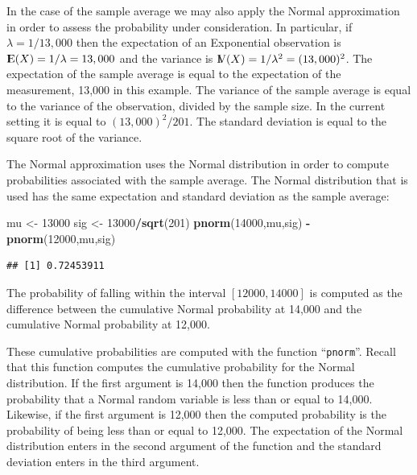 \documentclass[]{krantz}
\makeatletter
\newenvironment{Shaded}{\begin{snugshade}}{\end{snugshade}}
\newcommand{\KeywordTok}[1]{\textcolor[rgb]{0.13,0.29,0.53}{\textbf{#1}}}
\newcommand{\DecValTok}[1]{\textcolor[rgb]{0.00,0.00,0.81}{#1}}
\newcommand{\StringTok}[1]{\textcolor[rgb]{0.31,0.60,0.02}{#1}}
\newcommand{\OperatorTok}[1]{\textcolor[rgb]{0.81,0.36,0.00}{\textbf{#1}}}
\newcommand{\NormalTok}[1]{#1}
\newcommand{\Expec}{{\rm I\kern-.3em E}}
\newcommand{\Var}{{\rm I\kern-.3em V}}
\newenvironment{kframe}{%
\medskip{}
\setlength{\fboxsep}{.8em}
 \def\at@end@of@kframe{}%
 \ifinner\ifhmode%
  \def\at@end@of@kframe{\end{minipage}}%
  \begin{minipage}{\columnwidth}%
 \fi\fi%
 \def\FrameCommand##1{\hskip\@totalleftmargin \hskip-\fboxsep
 \colorbox{shadecolor}{##1}\hskip-\fboxsep
     \hskip-\linewidth \hskip-\@totalleftmargin \hskip\columnwidth}%
 \MakeFramed {\advance\hsize-\width
   \@totalleftmargin\z@ \linewidth\hsize
   \@setminipage}}%
 {\par\unskip\endMakeFramed%
 \at@end@of@kframe}
\renewenvironment{Shaded}{\begin{kframe}}{\end{kframe}}
\theoremstyle{definition}
\theoremstyle{definition}
\theoremstyle{definition}
\theoremstyle{remark}
\makeatother
\begin{document}
In the case of the sample average we may also apply the Normal
approximation in order to assess the probability under consideration. In
particular, if \(\lambda = 1/13,000\) then the expectation of an
Exponential observation is \(\Expec(X) = 1/\lambda = 13,000\) and the
variance is \(\Var(X) = 1/\lambda^2 = (13,000)^2\). The expectation of
the sample average is equal to the expectation of the measurement,
13,000 in this example. The variance of the sample average is equal to
the variance of the observation, divided by the sample size. In the
current setting it is equal to \((13,000)^2/201\). The standard
deviation is equal to the square root of the variance.

The Normal approximation uses the Normal distribution in order to
compute probabilities associated with the sample average. The Normal
distribution that is used has the same expectation and standard
deviation as the sample average:

\begin{Shaded}
\begin{Highlighting}[]
\NormalTok{mu <-}\StringTok{ }\DecValTok{13000}
\NormalTok{sig <-}\StringTok{ }\DecValTok{13000}\OperatorTok{/}\KeywordTok{sqrt}\NormalTok{(}\DecValTok{201}\NormalTok{)}
\KeywordTok{pnorm}\NormalTok{(}\DecValTok{14000}\NormalTok{,mu,sig) }\OperatorTok{-}\StringTok{ }\KeywordTok{pnorm}\NormalTok{(}\DecValTok{12000}\NormalTok{,mu,sig)}
\end{Highlighting}
\end{Shaded}

\begin{verbatim}
## [1] 0.72453911
\end{verbatim}

The probability of falling within the interval \([12000, 14000]\) is
computed as the difference between the cumulative Normal probability at
14,000 and the cumulative Normal probability at 12,000.

These cumulative probabilities are computed with the function
``\texttt{pnorm}''. Recall that this function computes the cumulative
probability for the Normal distribution. If the first argument is 14,000
then the function produces the probability that a Normal random variable
is less than or equal to 14,000. Likewise, if the first argument is
12,000 then the computed probability is the probability of being less
than or equal to 12,000. The expectation of the Normal distribution
enters in the second argument of the function and the standard deviation
enters in the third argument.
\end{document}
